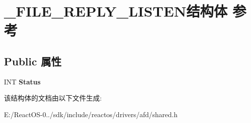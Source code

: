 \hypertarget{struct___f_i_l_e___r_e_p_l_y___l_i_s_t_e_n}{}\section{\+\_\+\+F\+I\+L\+E\+\_\+\+R\+E\+P\+L\+Y\+\_\+\+L\+I\+S\+T\+E\+N结构体 参考}
\label{struct___f_i_l_e___r_e_p_l_y___l_i_s_t_e_n}
\subsection*{Public 属性}
\begin{DoxyCompactItemize}
\item 
\mbox{\label{struct___f_i_l_e___r_e_p_l_y___l_i_s_t_e_n_a9a5d1148ef5def366960d32a0e1bfec9}} 
I\+NT {\bfseries Status}
\end{DoxyCompactItemize}


该结构体的文档由以下文件生成\+:\begin{DoxyCompactItemize}
\item 
E\+:/\+React\+O\+S-\/0../sdk/include/reactos/drivers/afd/shared.\+h\end{DoxyCompactItemize}
